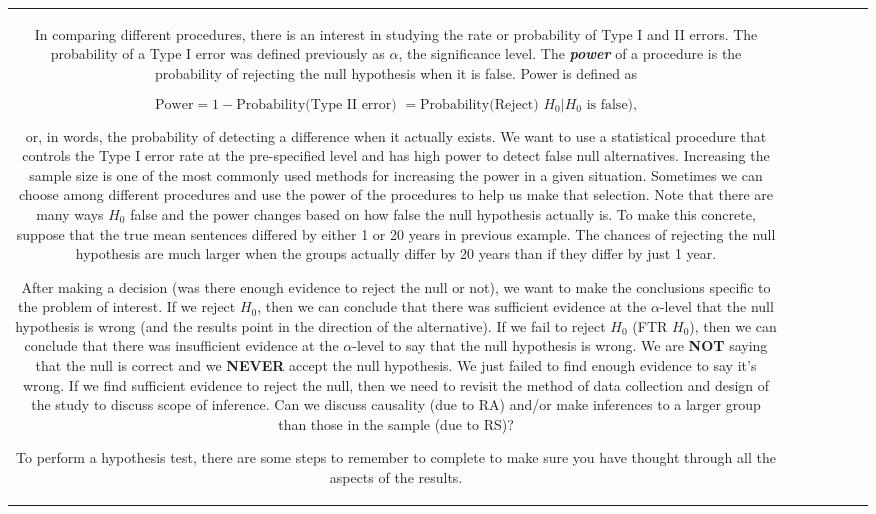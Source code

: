 \documentclass[]{book}
\theoremstyle{definition}
\theoremstyle{definition}
\theoremstyle{remark}
\begin{document}
\begin{longtable}[]{@{}ccccccc@{}}
\begin{minipage}[b]{0.10\columnwidth}
In comparing different procedures, there is an interest in studying the
rate or probability of Type I and II errors. The probability of a Type I
error was defined previously as \(\alpha\), the significance level. The
\textbf{\emph{power}} of a procedure is the probability of rejecting the
null hypothesis when it is false. Power is defined as

\[\text{Power} = 1 - \text{Probability(Type II error) } = 
\text{Probability(Reject) } H_0 | H_0 \text{ is false),}\]

or, in words, the probability of detecting a difference when it actually
exists. We want to use a statistical procedure that controls the Type I
error rate at the pre-specified level and has high power to detect false
null alternatives. Increasing the sample size is one of the most
commonly used methods for increasing the power in a given situation.
Sometimes we can choose among different procedures and use the power of
the procedures to help us make that selection. Note that there are many
ways \(H_0\) false and the power changes based on how false the null
hypothesis actually is. To make this concrete, suppose that the true
mean sentences differed by either 1 or 20 years in previous example. The
chances of rejecting the null hypothesis are much larger when the groups
actually differ by 20 years than if they differ by just 1 year.

After making a decision (was there enough evidence to reject the null or
not), we want to make the conclusions specific to the problem of
interest. If we reject \(H_0\), then we can conclude that there was
sufficient evidence at the \(\alpha\)-level that the null hypothesis is
wrong (and the results point in the direction of the alternative). If we
fail to reject \(H_0\) (FTR \(H_0\)), then we can conclude that there
was insufficient evidence at the \(\alpha\)-level to say that the null
hypothesis is wrong. We are \textbf{NOT} saying that the null is correct
and we \textbf{NEVER} accept the null hypothesis. We just failed to find
enough evidence to say it's wrong. If we find sufficient evidence to
reject the null, then we need to revisit the method of data collection
and design of the study to discuss scope of inference. Can we discuss
causality (due to RA) and/or make inferences to a larger group than
those in the sample (due to RS)?

To perform a hypothesis test, there are some steps to remember to
complete to make sure you have thought through all the aspects of the
results.


\end{minipage}
\end{longtable}
\end{document}
